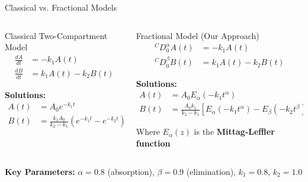 \documentclass[aspectratio=169]{beamer}
\newcommand{\highlight}[1]{\textcolor{kentech_orange}{\textbf{#1}}}
\begin{document}
\begin{frame}{Classical vs. Fractional Models}
    \begin{columns}
        \begin{column}{0.5\textwidth}
            \begin{block}{Classical Two-Compartment Model}
                \begin{align}
                    \frac{dA}{dt} &= -k_1 A(t) \\
                    \frac{dB}{dt} &= k_1 A(t) - k_2 B(t)
                \end{align}
                
                \textbf{Solutions:}
                \begin{align}
                    A(t) &= A_0 e^{-k_1 t} \\
                    B(t) &= \frac{k_1 A_0}{k_2-k_1}(e^{-k_1 t} - e^{-k_2 t})
                \end{align}
            \end{block}
        \end{column}
        
        \begin{column}{0.5\textwidth}
            \begin{block}{Fractional Model (Our Approach)}
                \begin{align}
                    {}^C D_0^\alpha A(t) &= -k_1 A(t) \\
                    {}^C D_0^\beta B(t) &= k_1 A(t) - k_2 B(t)
                \end{align}
                
                \textbf{Solutions:}
                \begin{align}
                    A(t) &= A_0 E_\alpha(-k_1 t^\alpha) \\
                    B(t) &= \frac{A_0 k_1}{k_2-k_1}[E_\alpha(-k_1 t^\alpha) - E_\beta(-k_2 t^\beta)]
                \end{align}
                
                Where $E_\alpha(z)$ is the \highlight{Mittag-Leffler function}
            \end{block}
        \end{column}
    \end{columns}
    
    \vspace{0.3cm}
    \begin{center}
        \highlight{Key Parameters:} $\alpha = 0.8$ (absorption), $\beta = 0.9$ (elimination), $k_1 = 0.8$, $k_2 = 1.0$
    \end{center}
\end{frame}
\end{document}
